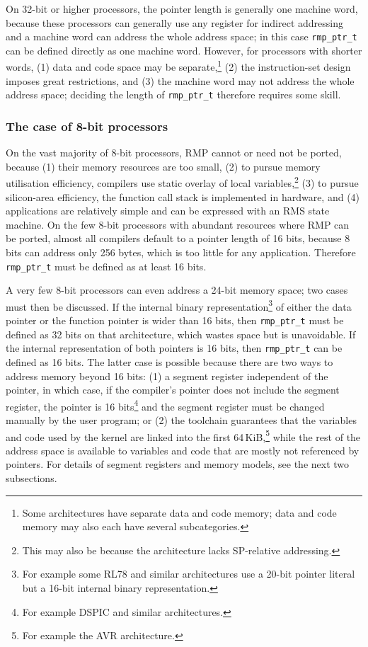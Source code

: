 On 32-bit or higher processors, the pointer length is generally one machine word, because these processors can generally use any register for indirect addressing and a machine word can address the whole address space; in this case \texttt{rmp\_ptr\_t} can be defined directly as one machine word.
However, for processors with shorter words, (1) data and code space may be separate,\footnote{Some architectures have separate data and code memory; data and code memory may also each have several subcategories.} (2) the instruction-set design imposes great restrictions, and (3) the machine word may not address the whole address space; deciding the length of \texttt{rmp\_ptr\_t} therefore requires some skill.

\subsubsection{The case of 8-bit processors}

On the vast majority of 8-bit processors, RMP cannot or need not be ported, because (1) their memory resources are too small, (2) to pursue memory utilisation efficiency, compilers use static overlay of local variables,\footnote{This may also be because the architecture lacks SP-relative addressing.} (3) to pursue silicon-area efficiency, the function call stack is implemented in hardware, and (4) applications are relatively simple and can be expressed with an RMS state machine.
On the few 8-bit processors with abundant resources where RMP can be ported, almost all compilers default to a pointer length of 16 bits, because 8 bits can address only 256 bytes, which is too little for any application.
Therefore \texttt{rmp\_ptr\_t} must be defined as at least 16 bits.

A very few 8-bit processors can even address a 24-bit memory space; two cases must then be discussed.
If the internal binary representation\footnote{For example some RL78 and similar architectures use a 20-bit pointer literal but a 16-bit internal binary representation.} of either the data pointer or the function pointer is wider than 16 bits, then \texttt{rmp\_ptr\_t} must be defined as 32 bits on that architecture, which wastes space but is unavoidable.
If the internal representation of both pointers is 16 bits, then \texttt{rmp\_ptr\_t} can be defined as 16 bits.
The latter case is possible because there are two ways to address memory beyond 16 bits: (1) a segment register independent of the pointer, in which case, if the compiler's pointer does not include the segment register, the pointer is 16 bits\footnote{For example DSPIC and similar architectures.} and the segment register must be changed manually by the user program; or (2) the toolchain guarantees that the variables and code used by the kernel are linked into the first 64\,KiB,\footnote{For example the AVR architecture.} while the rest of the address space is available to variables and code that are mostly not referenced by pointers.
For details of segment registers and memory models, see the next two subsections.

